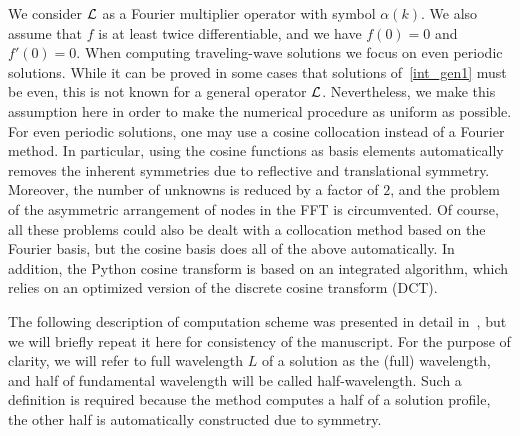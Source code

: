 We consider $\mathcal{L}$ as a Fourier multiplier operator with symbol
$\alpha(k)$. We also assume that $f$ is at least twice differentiable,
and we have $f(0)=0$ and $f'(0)=0$.
When computing traveling-wave solutions we focus on even periodic solutions. 
While it can be proved in some cases that solutions of~\eqref{int_gen1}
must be even, this is not known for a general operator $\mathcal{L}$.
Nevertheless, we make this assumption here in order to
make the numerical procedure as uniform as possible.
For even periodic solutions, 
one may use a cosine collocation instead of a Fourier method. In particular, using
the cosine functions as basis elements automatically removes the inherent symmetries
due to reflective and translational symmetry. 
Moreover, the number of unknowns is reduced by a factor of $2$, 
and the problem of the asymmetric arrangement of nodes in the FFT
is circumvented. Of course, all these problems could also be dealt with a collocation
method based on the Fourier basis, but the cosine basis does all of the above automatically.
In addition,  the \textsf{Python} cosine transform is based on an integrated algorithm, which
relies on an optimized version of the discrete cosine transform (DCT).
	
The following description of computation scheme was presented in detail in~\cite{Ehrnstrom2013}, 
but we will briefly repeat it here for consistency of the manuscript. For the purpose of clarity, 
we will refer to full wavelength $L$ of a solution as the (full) wavelength, 
and half of fundamental wavelength will be called half-wavelength. 
Such a definition is required because the method computes a half of a solution profile, 
the other half is automatically constructed due to symmetry.
 
